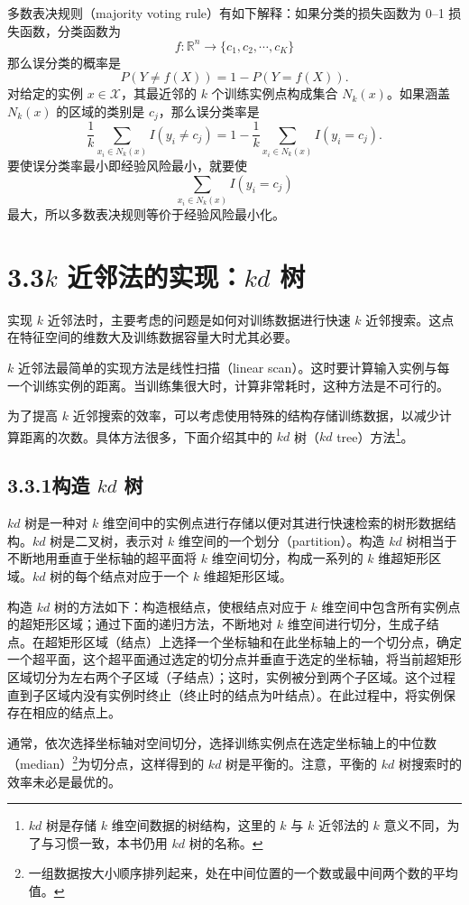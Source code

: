 \documentclass[UTF8, 12pt, fontset=fandol, oneside]{ctexart}
\begin{document}
多数表决规则（majority voting rule）有如下解释：如果分类的损失函数为 0--1 损失函数，分类函数为
\[
f:\mathbb{R}^n\to \{c_1,c_2,\cdots,c_K\}
\]
那么误分类的概率是
\[
P(Y\ne f(X))=1-P(Y=f(X)).
\]
对给定的实例 $x\in\mathcal{X}$，其最近邻的 $k$ 个训练实例点构成集合 $N_k(x)$。如果涵盖 $N_k(x)$ 的区域的类别是 $c_j$，那么误分类率是
\[
\frac{1}{k}\sum_{x_i\in N_k(x)}I(y_i\ne c_j)
=1-\frac{1}{k}\sum_{x_i\in N_k(x)}I(y_i=c_j).
\]
要使误分类率最小即经验风险最小，就要使
\[
\sum_{x_i\in N_k(x)}I(y_i=c_j)
\]
最大，所以多数表决规则等价于经验风险最小化。

\section*{3.3\quad $k$ 近邻法的实现：$kd$ 树}

实现 $k$ 近邻法时，主要考虑的问题是如何对训练数据进行快速 $k$ 近邻搜索。这点在特征空间的维数大及训练数据容量大时尤其必要。

$k$ 近邻法最简单的实现方法是线性扫描（linear scan）。这时要计算输入实例与每一个训练实例的距离。当训练集很大时，计算非常耗时，这种方法是不可行的。

为了提高 $k$ 近邻搜索的效率，可以考虑使用特殊的结构存储训练数据，以减少计算距离的次数。具体方法很多，下面介绍其中的 $kd$ 树（$kd$ tree）方法\footnote{$kd$ 树是存储 $k$ 维空间数据的树结构，这里的 $k$ 与 $k$ 近邻法的 $k$ 意义不同，为了与习惯一致，本书仍用 $kd$ 树的名称。}。

\subsection*{3.3.1\quad 构造 $kd$ 树}

$kd$ 树是一种对 $k$ 维空间中的实例点进行存储以便对其进行快速检索的树形数据结构。$kd$ 树是二叉树，表示对 $k$ 维空间的一个划分（partition）。构造 $kd$ 树相当于不断地用垂直于坐标轴的超平面将 $k$ 维空间切分，构成一系列的 $k$ 维超矩形区域。$kd$ 树的每个结点对应于一个 $k$ 维超矩形区域。

构造 $kd$ 树的方法如下：构造根结点，使根结点对应于 $k$ 维空间中包含所有实例点的超矩形区域；通过下面的递归方法，不断地对 $k$ 维空间进行切分，生成子结点。在超矩形区域（结点）上选择一个坐标轴和在此坐标轴上的一个切分点，确定一个超平面，这个超平面通过选定的切分点并垂直于选定的坐标轴，将当前超矩形区域切分为左右两个子区域（子结点）；这时，实例被分到两个子区域。这个过程直到子区域内没有实例时终止（终止时的结点为叶结点）。在此过程中，将实例保存在相应的结点上。

通常，依次选择坐标轴对空间切分，选择训练实例点在选定坐标轴上的中位数（median）\footnote{一组数据按大小顺序排列起来，处在中间位置的一个数或最中间两个数的平均值。}为切分点，这样得到的 $kd$ 树是平衡的。注意，平衡的 $kd$ 树搜索时的效率未必是最优的。
\end{document}
